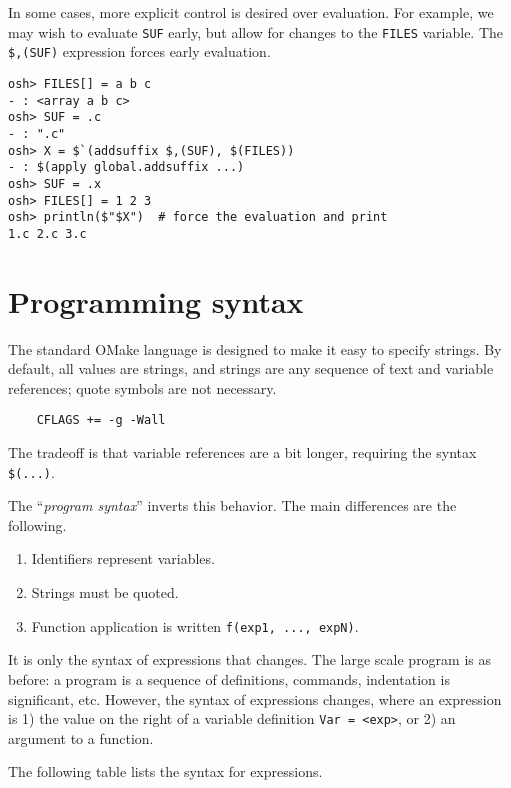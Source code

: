 In some cases, more explicit control is desired over evaluation.  For example, we may wish to
evaluate \verb+SUF+ early, but allow for changes to the \verb+FILES+ variable.  The \verb+$,(SUF)+
expression forces early evaluation.

\begin{verbatim}
osh> FILES[] = a b c
- : <array a b c>
osh> SUF = .c
- : ".c"
osh> X = $`(addsuffix $,(SUF), $(FILES))
- : $(apply global.addsuffix ...)
osh> SUF = .x
osh> FILES[] = 1 2 3
osh> println($"$X")  # force the evaluation and print
1.c 2.c 3.c
\end{verbatim}

\section{Programming syntax}
\label{section:program-syntax}

\newinkeyword

The standard OMake language is designed to make it easy to specify strings.  By default, all values
are strings, and strings are any sequence of text and variable references; quote symbols are not
necessary.

\begin{verbatim}
    CFLAGS += -g -Wall
\end{verbatim}

The tradeoff is that variable references are a bit longer, requiring the syntax \verb+$(...)+.

The ``\emph{program syntax}'' inverts this behavior.  The main differences are the following.

\begin{enumerate}
\item Identifiers represent variables.
\item Strings must be quoted.
\item Function application is written \verb+f(exp1, ..., expN)+.
\end{enumerate}

It is only the syntax of expressions that changes.  The large scale program is as before: a program
is a sequence of definitions, commands, indentation is significant, etc.  However, the syntax of expressions
changes, where an expression is 1) the value on the right of a variable definition \verb+Var = <exp>+, or 2)
an argument to a function.

The following table lists the syntax for expressions.


